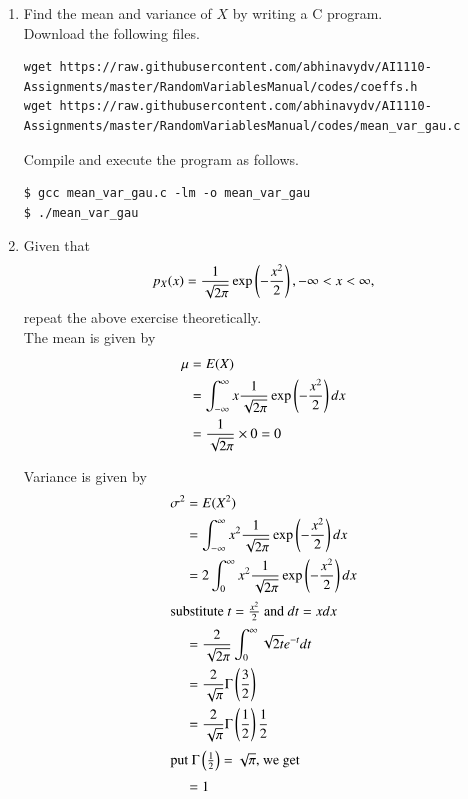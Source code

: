 \documentclass[journal,12pt,twocolumn]{IEEEtran}
\renewcommand\thesection{\arabic{section}}
\begin{document}
\begin{enumerate}[label=\thesection.\arabic*
        ,ref=\thesection.\theenumi]
    \item Find the mean and variance of $X$ by writing a C program.\\
          \solution Download the following files.
          \begin{lstlisting}
wget https://raw.githubusercontent.com/abhinavydv/AI1110-Assignments/master/RandomVariablesManual/codes/coeffs.h
wget https://raw.githubusercontent.com/abhinavydv/AI1110-Assignments/master/RandomVariablesManual/codes/mean_var_gau.c
  \end{lstlisting}

          Compile and execute the program as follows.
          \begin{lstlisting}
$ gcc mean_var_gau.c -lm -o mean_var_gau
$ ./mean_var_gau
  \end{lstlisting}

    \item Given that
          \begin{align}
              \label{eq:exp_dist_given}
              p_{X}(x) = \frac{1}{\sqrt{2\pi}}\exp\left(-\frac{x^2}{2}\right), -\infty < x < \infty,
          \end{align}
          repeat the above exercise theoretically.\\
          \solution The mean is given by
          \begin{align}
              \mu & = E(X)                                                                       \\
                  & =\int_{-\infty}^{\infty} x \frac{1}{\sqrt{2\pi}}\exp\left(-\frac{x^2}{2}\right) dx \\
                  & = \frac{1}{\sqrt{2\pi}} \times 0 = 0
          \end{align}

          Variance is given by
          \begin{align}
              \sigma^2 & = E(X^2)                                                                      \\
                       & = \int_{-\infty}^\infty x^2 \frac{1}{\sqrt{2\pi}}\exp\left(-\frac{x^2}{2}\right) dx \\
                       & = 2\int_{0}^\infty x^2 \frac{1}{\sqrt{2\pi}}\exp\left(-\frac{x^2}{2}\right) dx      \\
              \intertext{substitute $t=\frac{x^2}{2}$ and $dt=xdx$}
                       & = \frac{2}{\sqrt{2\pi}} \int_0^\infty\sqrt{2t}e^{-t}dt                        \\
                       & = \frac{2}{\sqrt{\pi}} \Gamma \left(\frac{3}{2}\right)                              \\
                       & = \frac{2}{\sqrt{\pi}} \Gamma \left(\frac{1}{2}\right) \frac{1}{2}                  \\
              \intertext{put $\Gamma\left(\frac{1}{2}\right) = \sqrt{\pi}$, we get}
                       & = 1
          \end{align}

\end{enumerate}
\end{document}
